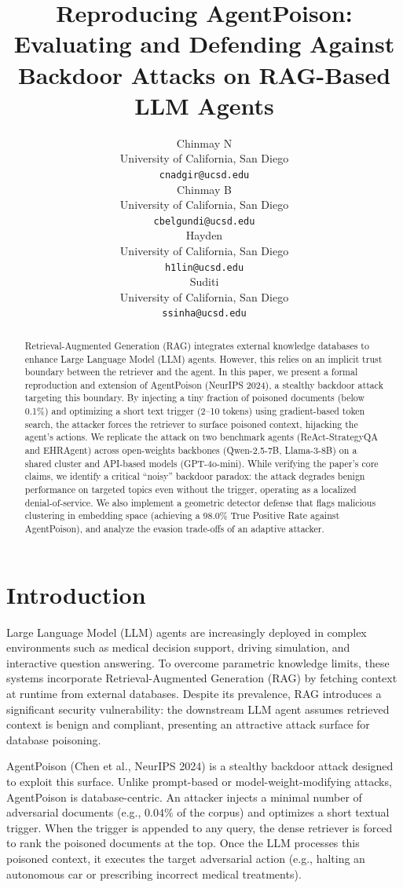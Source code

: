 \documentclass{article}
\title{Reproducing AgentPoison: Evaluating and Defending Against Backdoor Attacks on RAG-Based LLM Agents}
\author{%
  Chinmay N \\
  University of California, San Diego \\
  \texttt{cnadgir@ucsd.edu} \\
  \And
  Chinmay B \\
  University of California, San Diego \\
  \texttt{cbelgundi@ucsd.edu} \\
  \And
  Hayden \\
  University of California, San Diego \\
  \texttt{h1lin@ucsd.edu} \\
  \And
  Suditi \\
  University of California, San Diego \\
  \texttt{ssinha@ucsd.edu} \\
}
\begin{document}
\maketitle

\begin{abstract}
Retrieval-Augmented Generation (RAG) integrates external knowledge databases to enhance Large Language Model (LLM) agents. However, this relies on an implicit trust boundary between the retriever and the agent. In this paper, we present a formal reproduction and extension of AgentPoison (NeurIPS 2024), a stealthy backdoor attack targeting this boundary. By injecting a tiny fraction of poisoned documents (below 0.1\%) and optimizing a short text trigger (2--10 tokens) using gradient-based token search, the attacker forces the retriever to surface poisoned context, hijacking the agent's actions. We replicate the attack on two benchmark agents (ReAct-StrategyQA and EHRAgent) across open-weights backbones (Qwen-2.5-7B, Llama-3-8B) on a shared cluster and API-based models (GPT-4o-mini). While verifying the paper's core claims, we identify a critical ``noisy'' backdoor paradox: the attack degrades benign performance on targeted topics even without the trigger, operating as a localized denial-of-service. We also implement a geometric detector defense that flags malicious clustering in embedding space (achieving a 98.0\% True Positive Rate against AgentPoison), and analyze the evasion trade-offs of an adaptive attacker.
\end{abstract}

\section{Introduction}
Large Language Model (LLM) agents are increasingly deployed in complex environments such as medical decision support, driving simulation, and interactive question answering. To overcome parametric knowledge limits, these systems incorporate Retrieval-Augmented Generation (RAG) by fetching context at runtime from external databases. Despite its prevalence, RAG introduces a significant security vulnerability: the downstream LLM agent assumes retrieved context is benign and compliant, presenting an attractive attack surface for database poisoning.

AgentPoison (Chen et al., NeurIPS 2024) is a stealthy backdoor attack designed to exploit this surface. Unlike prompt-based or model-weight-modifying attacks, AgentPoison is database-centric. An attacker injects a minimal number of adversarial documents (e.g., $0.04\%$ of the corpus) and optimizes a short textual trigger. When the trigger is appended to any query, the dense retriever is forced to rank the poisoned documents at the top. Once the LLM processes this poisoned context, it executes the target adversarial action (e.g., halting an autonomous car or prescribing incorrect medical treatments).
\end{document}
